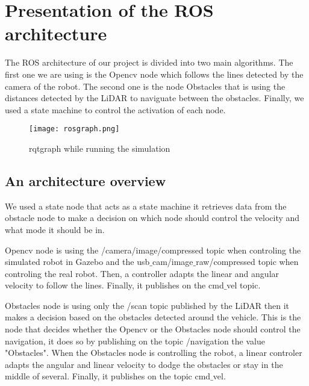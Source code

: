 \documentclass[conference]{IEEEtran}
\begin{document}
\section{Presentation of the ROS architecture}
The ROS architecture of our project is divided into two main algorithms.  The first one we are using is the Opencv node which follows the lines detected by the camera of the robot. The second one is the node Obstacles that is using the distances detected by the LiDAR to naviguate between the obstacles. Finally, we used a state machine to control the activation of each node.

\begin{figure}[htbp]
    \texttt{[image: rosgraph.png]}
    \caption{rqtgraph while running the simulation}
    \label{fig:rosgraph}
\end{figure}

\subsection{An architecture overview}
We used a state node that acts as a state machine it retrieves data from the obstacle node to make a decision on which node should control the velocity and what mode it should be in.

Opencv node is using the /camera/image/compressed topic when controling the simulated robot in Gazebo and the usb$\_$cam/image$\_$raw/compressed topic when controling the real robot. Then, a controller adapts the linear and angular velocity to follow the lines. Finally, it publishes on the cmd$\_$vel topic.

Obstacles node is using only the /scan topic published by the LiDAR then it makes a decision based on the obstacles detected around the vehicle. This is the node that decides whether the Opencv or the Obstacles node should control the navigation, it does so by publishing on the topic /navigation the value "Obstacles". When the Obstacles node is controlling the robot, a linear controler adapts the angular and linear velocity to dodge the obstacles or stay in the middle of several. Finally, it publishes on the topic cmd$\_$vel. 
\end{document}
